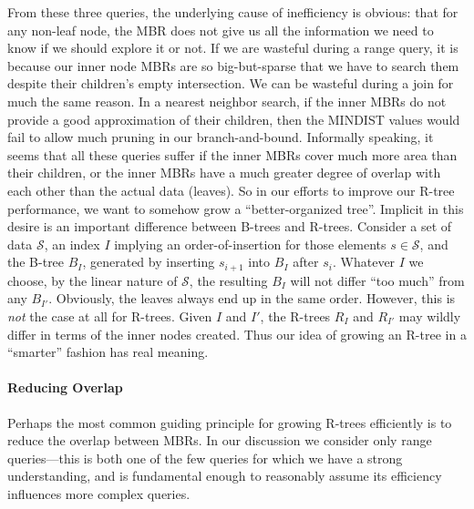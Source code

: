 From these three queries, the underlying cause of inefficiency is obvious: that for any non-leaf node, the MBR does not give us all the information we need to know if we should explore it or not.
If we are wasteful during a range query, it is because our inner node MBRs are so big-but-sparse that we have to search them despite their children's empty intersection.
We can be wasteful during a join for much the same reason.
In a nearest neighbor search, if the inner MBRs do not provide a good approximation of their children, then the MINDIST values would fail to allow much pruning in our branch-and-bound.
Informally speaking, it seems that all these queries suffer if the inner MBRs cover much more area than their children, or the inner MBRs have a much greater degree of overlap with each other than the actual data (leaves).
So in our efforts to improve our R-tree performance, we want to somehow grow a ``better-organized tree''.
Implicit in this desire is an important difference between B-trees and R-trees.
Consider a set of data $\mathcal S$, an index $I$ implying an order-of-insertion for those elements $s\in \mathcal S$, and the B-tree $B_I$, generated by inserting $s_{i+1}$ into $B_I$ after $s_{i}$.
Whatever $I$ we choose, by the linear nature of $\mathcal S$, the resulting $B_I$ will not differ ``too much'' from any $B_{I\prime}$.
Obviously, the leaves always end up in the same order.
However, this is \emph{not} the case at all for R-trees.
Given $I$ and $I\prime$, the R-trees $R_I$ and $R_{I\prime}$ may wildly differ in terms of the inner nodes created.
Thus our idea of growing an R-tree in a ``smarter'' fashion has real meaning.




\paragraph{Reducing Overlap}
Perhaps the most common guiding principle for growing R-trees efficiently is to reduce the overlap between MBRs.
In our discussion we consider only range queries---this is both one of the few queries for which we have a strong understanding, and is fundamental enough to reasonably assume its efficiency influences more complex queries.

